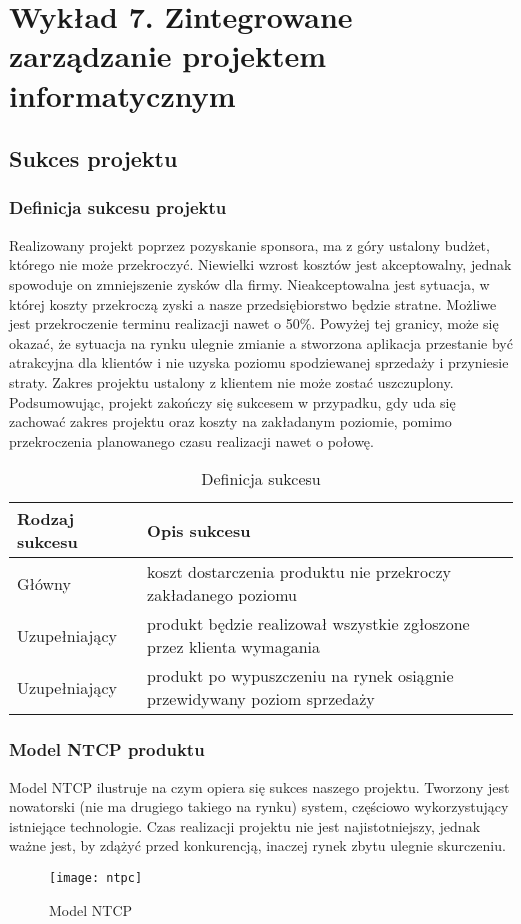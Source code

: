 \chapter{Wykład 7. Zintegrowane zarządzanie projektem informatycznym}

\section{Sukces projektu}

\subsection*{Definicja sukcesu projektu}
	Realizowany projekt poprzez pozyskanie sponsora, ma z góry ustalony budżet, którego nie może przekroczyć. Niewielki wzrost kosztów jest akceptowalny, jednak spowoduje on zmniejszenie zysków dla firmy. Nieakceptowalna jest sytuacja, w której koszty przekroczą zyski a nasze przedsiębiorstwo będzie stratne. Możliwe jest przekroczenie terminu realizacji nawet o 50\%. Powyżej tej granicy, może się okazać, że sytuacja na rynku ulegnie zmianie a stworzona aplikacja przestanie być atrakcyjna dla klientów i nie uzyska poziomu spodziewanej sprzedaży i przyniesie straty. Zakres projektu ustalony z klientem nie może zostać uszczuplony. Podsumowując, projekt zakończy się sukcesem w przypadku, gdy uda się zachować zakres projektu oraz koszty na zakładanym poziomie, pomimo przekroczenia planowanego czasu realizacji nawet o połowę.

\begin{table}[htb]
\centering
\begin{tabular}{l|p{7cm}}
		Rodzaj sukcesu & Opis sukcesu \\
\hline
\hline
		Główny & koszt dostarczenia produktu nie przekroczy zakładanego poziomu \\
\hline
		Uzupełniający & produkt będzie realizował wszystkie zgłoszone przez klienta wymagania \\
\hline
		Uzupełniający & produkt po wypuszczeniu na rynek osiągnie przewidywany poziom sprzedaży \\
\hline
\end{tabular}	
	\caption{Definicja sukcesu}
	\label{tab:defSukcesu}
\end{table}

\subsection*{Model NTCP produktu}
	Model NTCP ilustruje na czym opiera się sukces naszego projektu. Tworzony jest nowatorski (nie ma drugiego takiego na rynku) system, częściowo wykorzystujący istniejące technologie. Czas realizacji projektu nie jest najistotniejszy, jednak ważne jest, by zdążyć przed konkurencją, inaczej rynek zbytu ulegnie skurczeniu.
\begin{figure}[!h]
\centering
\texttt{[image: ntpc]}
\caption{Model NTCP}
\label{ntpc}
\end{figure}

